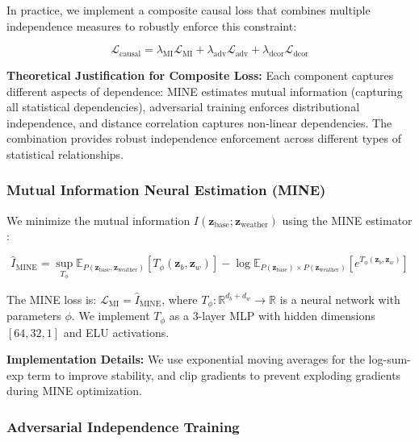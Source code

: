 \documentclass[journal]{IEEEtran}
\begin{document}
In practice, we implement a composite causal loss that combines multiple independence measures to robustly enforce this constraint:

\begin{equation}
\mathcal{L}_{\text{causal}} = \lambda_{\text{MI}} \mathcal{L}_{\text{MI}} + \lambda_{\text{adv}} \mathcal{L}_{\text{adv}} + \lambda_{\text{dcor}} \mathcal{L}_{\text{dcor}}
\label{eq:composite_causal_loss}
\end{equation}

\textbf{Theoretical Justification for Composite Loss:} Each component captures different aspects of dependence: MINE estimates mutual information (capturing all statistical dependencies), adversarial training enforces distributional independence, and distance correlation captures non-linear dependencies. The combination provides robust independence enforcement across different types of statistical relationships.

\subsubsection{Mutual Information Neural Estimation (MINE)}

We minimize the mutual information $I(\mathbf{z}_{\text{base}}; \mathbf{z}_{\text{weather}})$ using the MINE estimator \cite{belghazi2018mine}:

\begin{equation}
\hat{I}_{\text{MINE}} = \sup_{T_\phi} \mathbb{E}_{P(\mathbf{z}_{\text{base}}, \mathbf{z}_{\text{weather}})}[T_\phi(\mathbf{z}_b, \mathbf{z}_w)] - \log \mathbb{E}_{P(\mathbf{z}_{\text{base}}) \times P(\mathbf{z}_{\text{weather}})}[e^{T_\phi(\mathbf{z}_b, \mathbf{z}_w)}]
\label{eq:mine_estimator}
\end{equation}

The MINE loss is: $\mathcal{L}_{\text{MI}} = \hat{I}_{\text{MINE}}$, where $T_\phi: \mathbb{R}^{d_b + d_w} \rightarrow \mathbb{R}$ is a neural network with parameters $\phi$. We implement $T_\phi$ as a 3-layer MLP with hidden dimensions $[64, 32, 1]$ and ELU activations.

\textbf{Implementation Details:} We use exponential moving averages for the log-sum-exp term to improve stability, and clip gradients to prevent exploding gradients during MINE optimization.

\subsubsection{Adversarial Independence Training}
\end{document}

